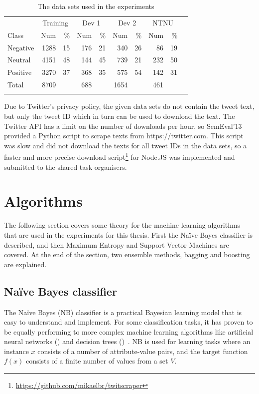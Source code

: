 \begin{table}[htb!]
\centering
\begin{tabular}{l|rrrrrrrrr}
\noalign{\smallskip}\hline\noalign{\smallskip}
& \multicolumn{2}{c}{Training} & \multicolumn{2}{c}{Dev 1} &\multicolumn{2}{c}{Dev 2} &\multicolumn{2}{c}{NTNU}  \\
Class & Num & \% & Num & \% & Num & \% & Num & \% \\

\noalign{\smallskip}\hline\noalign{\smallskip}
Negative & 1288 & 15 & 176 & 21 & 340 & 26 & 86 & 19\\
Neutral  & 4151 & 48 & 144 & 45 & 739 & 21 & 232 & 50 \\
Positive & 3270 & 37 & 368 & 35 & 575 & 54 & 142 & 31 \\ 
Total & 8709 && 688 && 1654 && 461 &\\ 
\noalign{\smallskip}\hline\noalign{\smallskip}
\end{tabular}
\caption{The data sets used in the experiments}
\label{tab:datasets}
\end{table}

Due to Twitter's privacy policy, the given data sets do not contain the tweet text, but only the tweet ID which in turn can be used to download the text. The Twitter API has a limit on the number of downloads per hour, so SemEval'13 provided a Python script to scrape texts from https://twitter.com. This script was slow and did not download the texts for all tweet IDs in the data sets, so a faster and more precise download script\footnote{\url{https://github.com/mikaelbr/twitscraper}} for Node.JS was implemented and submitted to the shared task organisers.

\section{Algorithms}

The following section covers some theory for the machine learning algorithms that are used in the experiments for this thesis. First the Na\"{i}ve Bayes classifier is described, and then Maximum Entropy and Support Vector Machines are covered. At the end of the section, two ensemble methods, bagging and boosting are explained.

\subsection{Na\"{i}ve Bayes classifier}
The Na\"{i}ve Bayes (NB) classifier is a practical Bayesian learning model that is easy to understand and implement. For some classification tasks, it has proven to be equally performing to more complex machine learning algorithms like artificial neural networks () and decision trees ()~\citep{book:Mitchell}. NB is used for learning tasks where an instance $x$ consists of a number of attribute-value pairs, and the target function $f(x)$ consists of a finite number of values from a set $V$.

